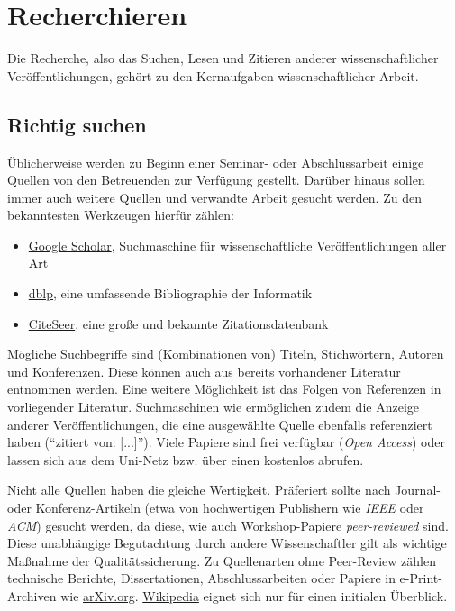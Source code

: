 \section{Recherchieren}%
\label{sec:Recherchieren}

Die Recherche, also das Suchen, Lesen und Zitieren anderer wissenschaftlicher Veröffentlichungen, gehört zu den Kernaufgaben wissenschaftlicher Arbeit.

\subsection{Richtig suchen}%
\label{sec:Recherchieren:Suchen}

Üblicherweise werden zu Beginn einer Seminar- oder Abschlussarbeit einige Quellen von den Betreuenden zur Verfügung gestellt.
Darüber hinaus sollen immer auch weitere Quellen und verwandte Arbeit gesucht werden.
Zu den bekanntesten Werkzeugen hierfür zählen:

\smallskip
\begin{itemize}[label={\symbolTool}]
    \item \href{https://scholar.google.com/}{Google Scholar}, Suchmaschine für wissenschaftliche Veröffentlichungen aller Art
    \item \href{https://dblp.org/}{dblp}, eine umfassende Bibliographie der Informatik
    \item \href{https://citeseerx.ist.psu.edu/}{CiteSeer}, eine große und bekannte Zitationsdatenbank
\end{itemize}
\smallskip

\noindent
Mögliche Suchbegriffe sind (Kombinationen von) Titeln, Stichwörtern, Autoren und Konferenzen.
Diese können auch aus bereits vorhandener Literatur entnommen werden.
Eine weitere Möglichkeit ist das Folgen von Referenzen in vorliegender Literatur.
Suchmaschinen wie  ermöglichen zudem die Anzeige anderer Veröffentlichungen, die eine ausgewählte Quelle ebenfalls referenziert haben (\enquote{zitiert von: [...]}).
Viele Papiere sind frei verfügbar (\emph{Open Access}) oder lassen sich aus dem Uni-Netz bzw. über einen  kostenlos abrufen.

Nicht alle Quellen haben die gleiche Wertigkeit. 
Präferiert sollte nach Journal- oder Konferenz-Artikeln (etwa von hochwertigen Publishern wie \emph{IEEE} oder \emph{ACM}) gesucht werden, da diese, wie auch Workshop-Papiere \emph{peer-reviewed} sind. 
Diese unabhängige Begutachtung durch andere Wissenschaftler gilt als wichtige Maßnahme der Qualitätssicherung. 
Zu Quellenarten ohne Peer-Review zählen technische Berichte, Dissertationen, Abschlussarbeiten oder Papiere in e-Print-Archiven wie \href{https://arXiv.org}{arXiv.org}.  
\href{https://www.wikipedia.org/}{Wikipedia} eignet sich nur für einen initialen Überblick.

